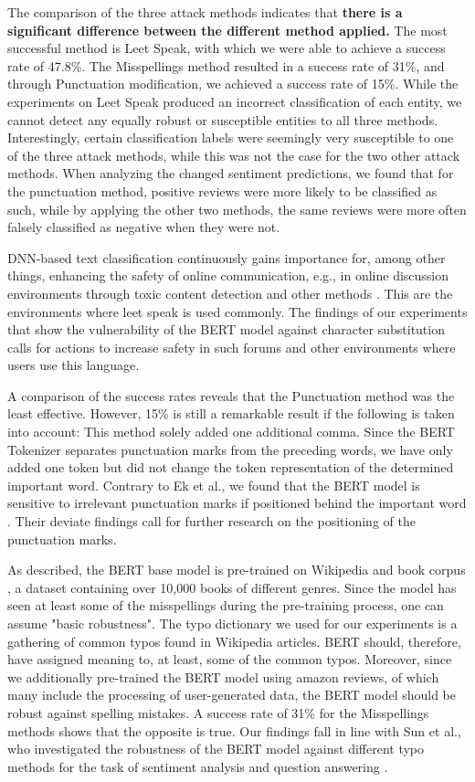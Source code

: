 The comparison of the three attack methods indicates that \textbf{there is a significant difference between the different method applied.} The most successful method is Leet Speak, with which we were able to achieve a success rate of 47.8\%. The Misspellings method resulted in a success rate of 31\%, and through Punctuation modification, we achieved a success rate of 15\%. While the experiments on Leet Speak produced an incorrect classification of each entity, we cannot detect any equally robust or susceptible entities to all three methods. Interestingly, certain classification labels were seemingly very susceptible to one of the three attack methods, while this was not the case for the two other attack methods. When analyzing the changed sentiment predictions, we found that for the punctuation method, positive reviews were more likely to be classified as such, while by applying the other two methods, the same reviews were more often falsely classified as negative when they were not. 

DNN-based text classification continuously gains importance for, among other things, enhancing the safety of online communication, e.g., in online discussion environments through toxic content detection and other methods \cite{kumar2011natural}. This are the environments where leet speak is used commonly. The findings of our experiments that show the vulnerability of the BERT model against character substitution calls for actions to increase safety in such forums and other environments where users use this language. 

A comparison of the success rates reveals that the Punctuation method was the least effective. However, 15\% is still a remarkable result if the following is taken into account:
This method solely added one additional comma. Since the BERT Tokenizer separates punctuation marks from the preceding words, we have only added one token but did not change the token representation of the determined important word. Contrary to Ek et al., we found that the BERT model is sensitive to irrelevant punctuation marks if positioned behind the important word \cite{ekdoes}. Their deviate findings call for further research on the positioning of the punctuation marks.  

As described, the BERT base model is pre-trained on Wikipedia and book corpus \cite{zhu2015aligning}, a dataset containing over 10,000 books of different genres. Since the model has seen at least some of the misspellings during the pre-training process, one can assume "basic robustness". The typo dictionary we used for our experiments is a gathering of common typos found in Wikipedia articles. BERT should, therefore, have assigned meaning to, at least, some of the common typos. Moreover, since we additionally pre-trained the BERT model using amazon reviews, of which many include the processing of user-generated data, the BERT model should be robust against spelling mistakes. A success rate of 31\% for the Misspellings methods shows that the opposite is true. Our findings fall in line with Sun et al., who investigated the robustness of the BERT model against different typo methods for the task of sentiment analysis and question answering \cite{sun2020adv}.

